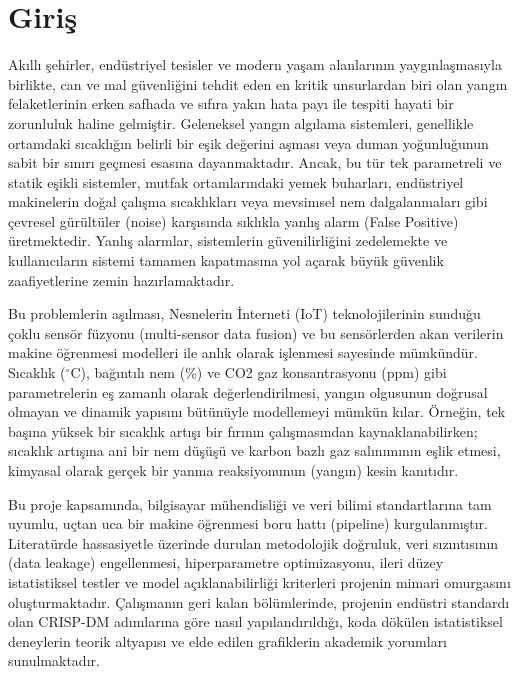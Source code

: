 \documentclass[12pt,a4paper]{article}
\begin{document}
\section{Giriş}
Akıllı şehirler, endüstriyel tesisler ve modern yaşam alanlarının yaygınlaşmasıyla birlikte, can ve mal güvenliğini tehdit eden en kritik unsurlardan biri olan yangın felaketlerinin erken safhada ve sıfıra yakın hata payı ile tespiti hayati bir zorunluluk haline gelmiştir. Geleneksel yangın algılama sistemleri, genellikle ortamdaki sıcaklığın belirli bir eşik değerini aşması veya duman yoğunluğunun sabit bir sınırı geçmesi esasına dayanmaktadır. Ancak, bu tür tek parametreli ve statik eşikli sistemler, mutfak ortamlarındaki yemek buharları, endüstriyel makinelerin doğal çalışma sıcaklıkları veya mevsimsel nem dalgalanmaları gibi çevresel gürültüler (noise) karşısında sıklıkla yanlış alarm (False Positive) üretmektedir. Yanlış alarmlar, sistemlerin güvenilirliğini zedelemekte ve kullanıcıların sistemi tamamen kapatmasına yol açarak büyük güvenlik zaafiyetlerine zemin hazırlamaktadır.

Bu problemlerin aşılması, Nesnelerin İnterneti (IoT) teknolojilerinin sunduğu çoklu sensör füzyonu (multi-sensor data fusion) ve bu sensörlerden akan verilerin makine öğrenmesi modelleri ile anlık olarak işlenmesi sayesinde mümkündür. Sıcaklık ($^\circ$C), bağıntılı nem (\%) ve CO2 gaz konsantrasyonu (ppm) gibi parametrelerin eş zamanlı olarak değerlendirilmesi, yangın olgusunun doğrusal olmayan ve dinamik yapısını bütünüyle modellemeyi mümkün kılar. Örneğin, tek başına yüksek bir sıcaklık artışı bir fırının çalışmasından kaynaklanabilirken; sıcaklık artışına ani bir nem düşüşü ve karbon bazlı gaz salınımının eşlik etmesi, kimyasal olarak gerçek bir yanma reaksiyonunun (yangın) kesin kanıtıdır.

Bu proje kapsamında, bilgisayar mühendisliği ve veri bilimi standartlarına tam uyumlu, uçtan uca bir makine öğrenmesi boru hattı (pipeline) kurgulanmıştır. Literatürde hassasiyetle üzerinde durulan metodolojik doğruluk, veri sızıntısının (data leakage) engellenmesi, hiperparametre optimizasyonu, ileri düzey istatistiksel testler ve model açıklanabilirliği kriterleri projenin mimari omurgasını oluşturmaktadır. Çalışmanın geri kalan bölümlerinde, projenin endüstri standardı olan CRISP-DM adımlarına göre nasıl yapılandırıldığı, koda dökülen istatistiksel deneylerin teorik altyapısı ve elde edilen grafiklerin akademik yorumları sunulmaktadır.
\end{document}
